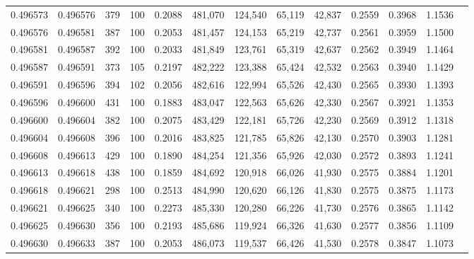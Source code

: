 \begin{tabular}{rrrrrrrrrrrrr}
0.496573 & 0.496576 &   379 & 100 &                                     0.2088 & 481,070 & 124,540 &  65,119 &  42,837 & 0.2559 & 0.3968 & 1.1536 \\
0.496576 & 0.496581 &   387 & 100 &                                     0.2053 & 481,457 & 124,153 &  65,219 &  42,737 & 0.2561 & 0.3959 & 1.1500 \\
0.496581 & 0.496587 &   392 & 100 &                                     0.2033 & 481,849 & 123,761 &  65,319 &  42,637 & 0.2562 & 0.3949 & 1.1464 \\
0.496587 & 0.496591 &   373 & 105 &                                     0.2197 & 482,222 & 123,388 &  65,424 &  42,532 & 0.2563 & 0.3940 & 1.1429 \\
0.496591 & 0.496596 &   394 & 102 &                                     0.2056 & 482,616 & 122,994 &  65,526 &  42,430 & 0.2565 & 0.3930 & 1.1393 \\
0.496596 & 0.496600 &   431 & 100 &                                     0.1883 & 483,047 & 122,563 &  65,626 &  42,330 & 0.2567 & 0.3921 & 1.1353 \\
0.496600 & 0.496604 &   382 & 100 &                                     0.2075 & 483,429 & 122,181 &  65,726 &  42,230 & 0.2569 & 0.3912 & 1.1318 \\
0.496604 & 0.496608 &   396 & 100 &                                     0.2016 & 483,825 & 121,785 &  65,826 &  42,130 & 0.2570 & 0.3903 & 1.1281 \\
0.496608 & 0.496613 &   429 & 100 &                                     0.1890 & 484,254 & 121,356 &  65,926 &  42,030 & 0.2572 & 0.3893 & 1.1241 \\
0.496613 & 0.496618 &   438 & 100 &                                     0.1859 & 484,692 & 120,918 &  66,026 &  41,930 & 0.2575 & 0.3884 & 1.1201 \\
0.496618 & 0.496621 &   298 & 100 &                                     0.2513 & 484,990 & 120,620 &  66,126 &  41,830 & 0.2575 & 0.3875 & 1.1173 \\
0.496621 & 0.496625 &   340 & 100 &                                     0.2273 & 485,330 & 120,280 &  66,226 &  41,730 & 0.2576 & 0.3865 & 1.1142 \\
0.496625 & 0.496630 &   356 & 100 &                                     0.2193 & 485,686 & 119,924 &  66,326 &  41,630 & 0.2577 & 0.3856 & 1.1109 \\
0.496630 & 0.496633 &   387 & 100 &                                     0.2053 & 486,073 & 119,537 &  66,426 &  41,530 & 0.2578 & 0.3847 & 1.1073 \\

\end{tabular}
